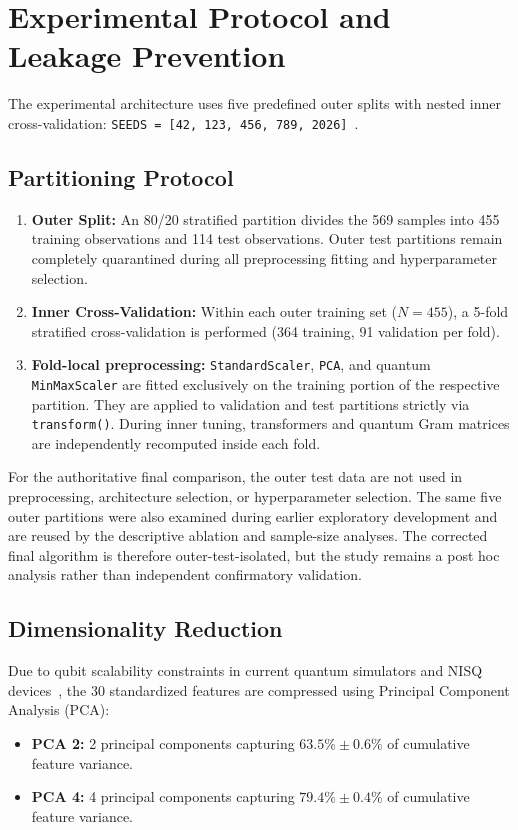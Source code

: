 \documentclass[12pt,a4paper]{article}
\begin{document}
\section{Experimental Protocol and Leakage Prevention}
The experimental architecture uses five predefined outer splits with nested inner cross-validation: \texttt{SEEDS = [42, 123, 456, 789, 2026]}~\cite{bowles2024better}.

\subsection{Partitioning Protocol}
\begin{enumerate}
    \item \textbf{Outer Split:} An 80/20 stratified partition divides the 569 samples into 455 training observations and 114 test observations. Outer test partitions remain completely quarantined during all preprocessing fitting and hyperparameter selection.
    \item \textbf{Inner Cross-Validation:} Within each outer training set ($N=455$), a 5-fold stratified cross-validation is performed (364 training, 91 validation per fold).
    \item \textbf{Fold-local preprocessing:} \texttt{StandardScaler}, \texttt{PCA}, and quantum \texttt{MinMaxScaler} are fitted exclusively on the training portion of the respective partition. They are applied to validation and test partitions strictly via \texttt{transform()}. During inner tuning, transformers and quantum Gram matrices are independently recomputed inside each fold.
\end{enumerate}

For the authoritative final comparison, the outer test data are not used in preprocessing, architecture selection, or hyperparameter selection. The same five outer partitions were also examined during earlier exploratory development and are reused by the descriptive ablation and sample-size analyses. The corrected final algorithm is therefore outer-test-isolated, but the study remains a post hoc analysis rather than independent confirmatory validation.

\subsection{Dimensionality Reduction}
Due to qubit scalability constraints in current quantum simulators and NISQ devices~\cite{preskill2018quantum}, the 30 standardized features are compressed using Principal Component Analysis (PCA):
\begin{itemize}
    \item \textbf{PCA 2:} 2 principal components capturing $63.5\% \pm 0.6\%$ of cumulative feature variance.
    \item \textbf{PCA 4:} 4 principal components capturing $79.4\% \pm 0.4\%$ of cumulative feature variance.
\end{itemize}
\end{document}
